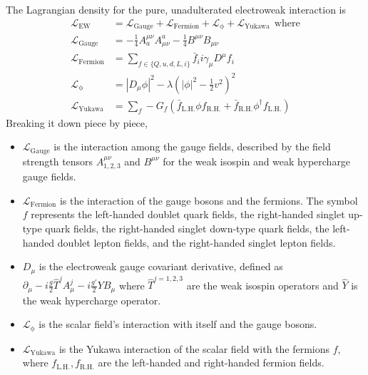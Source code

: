 The Lagrangian density for the pure, unadulterated electroweak interaction is
\begin{equation}
\begin{split}
\label{eq:EWpreSSB}
\mathcal{L}_\mathrm{EW} & = \mathcal{L}_\mathrm{Gauge} + \mathcal{L}_\mathrm{Fermion} + \mathcal{L}_\mathrm{\phi} + \mathcal{L}_\mathrm{Yukawa} \:\:\mathrm{where} \\
\mathcal{L}_\mathrm{Gauge}   & = -\frac{1}{4}A^{\mu\nu}_a A^a_{\mu\nu} - \frac{1}{4} B^{\mu\nu} B_{\mu\nu} \\
\mathcal{L}_\mathrm{Fermion} & = \sum_{f \in \{Q,u,d,L,i\}} \bar{f}_i i \gamma_\mu D^\mu f_i \\ 
\mathcal{L}_\mathrm{\phi}   & = |D_\mu \phi|^2 - \lambda \left( |\phi|^2 - \frac{1}{2} v^2 \right)^2 \\
\mathcal{L}_\mathrm{Yukawa}  & = \sum_f -G_f (\bar{f}_\mathrm{L.H.} \phi f_\mathrm{R.H.} + \bar{f}_\mathrm{R.H.} \phi^\dagger f_\mathrm{L.H.} )
\end{split}
\end{equation}
Breaking it down piece by piece, 
\begin{itemize}
  \setlength\itemsep{0em}
  \item $\mathcal{L}_\mathrm{Gauge}$ is the interaction among the gauge fields, described by the field strength tensors $A_{1,2,3}^{\mu\nu}$ and $B^{\mu\nu}$ for the weak isospin and weak hypercharge gauge fields.
  \item $\mathcal{L}_\mathrm{Fermion}$ is the interaction of the gauge bosons and the fermions. The symbol $f$ represents the left-handed doublet quark fields, the right-handed singlet up-type quark fields, the right-handed singlet down-type quark fields, the left-handed doublet lepton fields, and the right-handed singlet lepton fields. 
  \item $D_\mu$ is the electroweak gauge covariant derivative, defined as 
    $\partial_\mu - i\frac{g}{2} \hat{T}^j A^{j}_{\mu} - i \frac{g'}{2} Y B_\mu $ where $\hat{T}^{j=1,2,3}$ are the weak isospin operators and $\hat{Y}$ is the weak hypercharge operator. 
  \item $\mathcal{L}_\mathrm{\phi}$ is the scalar field's interaction with itself and the gauge bosons.
  \item $\mathcal{L}_\mathrm{Yukawa}$ is the Yukawa interaction of the scalar field with the fermions $f$, where $f_\mathrm{L.H.}, f_\mathrm{R.H.}$ are the left-handed and right-handed fermion fields.
\end{itemize}


